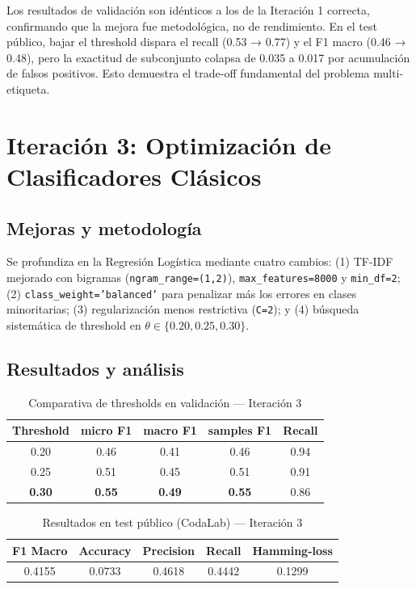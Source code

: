 \documentclass[11pt, a4paper]{article}
\begin{document}
Los resultados de validación son idénticos a los de la Iteración 1 correcta, confirmando que la mejora fue metodológica, no de rendimiento. En el test público, bajar el threshold dispara el recall (0.53 → 0.77) y el F1 macro (0.46 → 0.48), pero la exactitud de subconjunto colapsa de 0.035 a 0.017 por acumulación de falsos positivos. Esto demuestra el trade-off fundamental del problema multi-etiqueta.

\section{Iteración 3: Optimización de Clasificadores Clásicos}

\subsection{Mejoras y metodología}

Se profundiza en la Regresión Logística mediante cuatro cambios: (1) TF-IDF mejorado con bigramas (\texttt{ngram\_range=(1,2)}), \texttt{max\_features=8000} y \texttt{min\_df=2}; (2) \texttt{class\_weight='balanced'} para penalizar más los errores en clases minoritarias; (3) regularización menos restrictiva (\texttt{C=2}); y (4) búsqueda sistemática de threshold en $\theta \in \{0.20, 0.25, 0.30\}$.

\subsection{Resultados y análisis}

\begin{table}[H]
\centering
\caption{Comparativa de thresholds en validación --- Iteración 3}
\begin{tabular}{ccccc}
\toprule
\textbf{Threshold} & \textbf{micro F1} & \textbf{macro F1} & \textbf{samples F1} & \textbf{Recall} \\
\midrule
0.20 & 0.46 & 0.41 & 0.46 & 0.94 \\
0.25 & 0.51 & 0.45 & 0.51 & 0.91 \\
\textbf{0.30} & \textbf{0.55} & \textbf{0.49} & \textbf{0.55} & 0.86 \\
\bottomrule
\end{tabular}
\end{table}

\begin{table}[H]
\centering
\caption{Resultados en test público (CodaLab) --- Iteración 3}
\begin{tabular}{ccccc}
\toprule
\textbf{F1 Macro} & \textbf{Accuracy} & \textbf{Precision} & \textbf{Recall} & \textbf{Hamming-loss} \\
\midrule
0.4155 & 0.0733 & 0.4618 & 0.4442 & 0.1299 \\
\bottomrule
\end{tabular}
\end{table}
\end{document}
